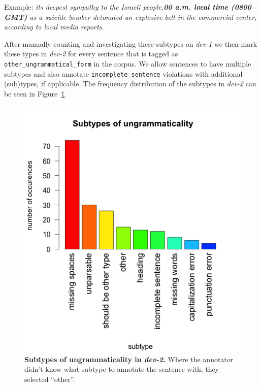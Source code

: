 \documentclass[a4paper,10pt]{scrartcl}
\theoremstyle{style}
\begin{document}
\begin{description}
	Example: \textit{its deepest sympathy to the Israeli people,\textbf{00 a.m. local time (0800 GMT)} as a suicide bomber detonated an explosive belt in the commercial center, according to local media reports.}
%


\end{description}

After manually counting and investigating these subtypes on \textit{dev-1} we then mark these types in \textit{dev-2} for every sentence that is tagged as \texttt{other\_ungrammatical\_form} in the corpus. We allow sentences to have multiple subtypes and also annotate \texttt{incomplete\_sentence} violations with additional (sub)types, if applicable. The frequency distribution of the subtypes in \textit{dev-2} can be seen in Figure~\ref{subtypes}.

\begin{figure}
\begin{center}
\includegraphics[scale=0.6]{subtypes_dev2.png}
\end{center}
\caption{\textbf{Subtypes of ungrammaticality in \textit{dev-2}.} Where the annotator didn't know what subtype to annotate the sentence with, they selected ``other''.}
\label{subtypes}
\end{figure}
\end{document}
